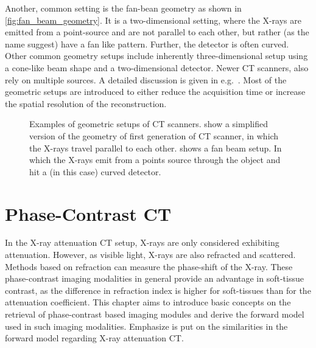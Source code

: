 Another, common setting is the fan-bean geometry as shown in \autoref{fig:fan_beam_geometry}. It is
a two-dimensional setting, where the X-rays are emitted from a point-source and are not parallel to
each other, but rather (as the name suggest) have a fan like pattern. Further, the detector is often
curved. Other common geometry setups include inherently three-dimensional setup using a cone-like
beam shape and a two-dimensional detector. Newer CT scanners, also rely on multiple sources. A
detailed discussion is given in e.g.\ \cite{buzug_computed_2008}. Most of the geometric setups are
introduced to either reduce the acquisition time or increase the spatial resolution of the
reconstruction.

\begin{figure}
	\centering
	\caption{Examples of geometric setups of CT scanners. 
		show a simplified version of the geometry of first generation of CT scanner, in
		which the X-rays travel parallel to each other.  shows
		a fan beam setup. In which the X-rays emit from a points source through the object
		and hit a (in this case) curved detector.}\label{fig:ct_geometry_setup}
\end{figure}

\section{Phase-Contrast CT}\label{sec:phasecontrast_ct}

In the X-ray attenuation CT setup, X-rays are only considered exhibiting attenuation. However, as
visible light, X-rays are also refracted and scattered. Methods based on refraction can measure the
phase-shift of the X-ray. These phase-contrast imaging modalities in general provide an advantage in
soft-tissue contrast, as the difference in refraction index is higher for soft-tissues than for the
attenuation coefficient. This chapter aims to introduce basic concepts on the retrieval of
phase-contrast based imaging modules and derive the forward model used in such imaging modalities.
Emphasize is put on the similarities in the forward model regarding X-ray attenuation CT\@.

